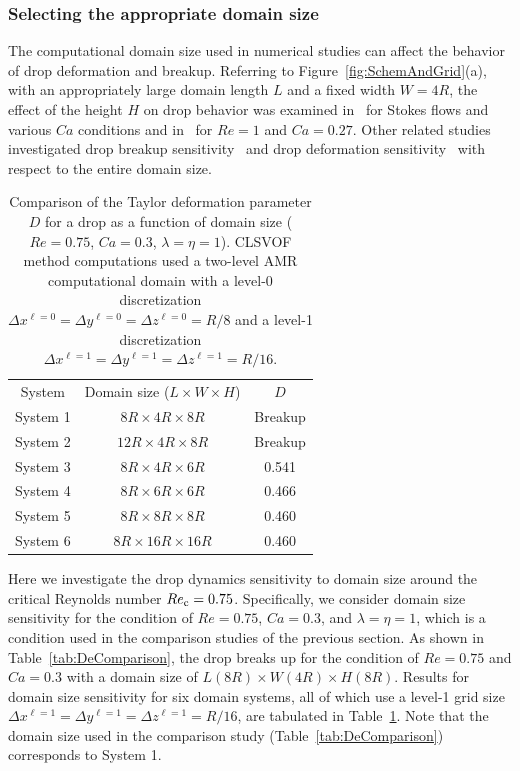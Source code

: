 \documentclass[review]{elsarticle}
\newcommand{\LWH}{L\times W \times H}
\newcommand{\lwh}[3]{L(#1R)\times W(#2R) \times H(#3R)}
\begin{document}
\subsubsection{Selecting the appropriate domain size}

The computational domain size used in numerical studies can affect the behavior
of drop deformation and breakup.  Referring to
Figure~\ref{fig:SchemAndGrid}(a), with an appropriately large domain length $L$
and a fixed width $W=4R$, the effect of the height $H$ on drop behavior was
examined in~\cite{LiRenRen00} for Stokes flows and various $Ca$ conditions and
in~\cite{KomShaEskDer14} for $Re=1$ and $Ca=0.27$.  Other related studies
investigated drop breakup sensitivity~\cite{RenCri01-1} and drop deformation
sensitivity~\cite{RenCriLi02} with respect to the entire domain size.
%
\begin{table}[tbh]
\caption{Comparison of the Taylor deformation parameter $D$ for a drop as a function of
         domain size ($Re=0.75$, $Ca=0.3$, $\lambda = \eta = 1$).
         CLSVOF method computations used a two-level AMR computational domain 
         with a level-0 discretization $\Delta x^{\ell=0} = \Delta y^{\ell=0} 
         = \Delta z^{\ell=0} = R/8$ and a level-1 discretization
         $\Delta x^{\ell=1} = \Delta y^{\ell=1} = \Delta z^{\ell=1} = R/16$.}
\label{tab:DomComparison}
\center
\begin{tabular}{ c  c  c}
\hline
\hline
System      & Domain size ($\LWH$)         & $D$     \\
System 1    & $8R  \times 4R  \times 8R$   & Breakup \\
System 2    & $12R \times 4R  \times 8R$   & Breakup \\
System 3    & $8R  \times 4R  \times 6R$   & 0.541   \\
System 4    & $8R  \times 6R  \times 6R$   & 0.466   \\
System 5    & $8R  \times 8R  \times 8R$   & 0.460   \\
System 6    & $8R  \times 16R \times 16R$  & 0.460   \\
\hline
\hline
\end{tabular}
\end{table}
%

Here we investigate the drop dynamics sensitivity to domain size around the
critical Reynolds number $Re_{\rm c}=0.75$.  Specifically, we consider domain size
sensitivity for the condition of $Re=0.75$, $Ca=0.3$, and $\lambda = \eta = 1$,
which is a condition used in the comparison studies of the previous section.
As shown in Table~\ref{tab:DeComparison}, the drop breaks up for the condition
of $Re=0.75$ and $Ca=0.3$ with a domain size of $\lwh{8}{4}{8}$.  Results for
domain size sensitivity for six domain systems, all of which use a level-1 grid
size $\Delta x^{\ell=1} = \Delta y^{\ell=1}= \Delta z^{\ell=1} = R/16$, are
tabulated in Table~\ref{tab:DomComparison}. Note that the domain size used in
the comparison study (Table~\ref{tab:DeComparison}) corresponds to System 1.
\end{document}
